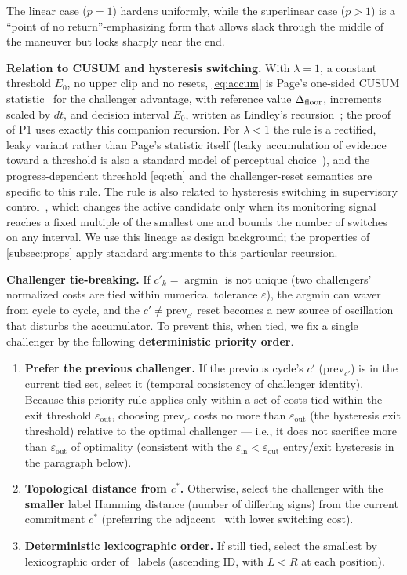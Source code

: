 The linear case ($p=1$) hardens uniformly, while the superlinear case ($p>1$) is a ``point of no return''-emphasizing form that allows slack through the middle of the maneuver but locks sharply near the end.

\noindent\textbf{Relation to CUSUM and hysteresis switching.} With $\lambda=1$, a constant threshold $E_0$, no upper clip and no resets, \eqref{eq:accum} is Page's one-sided CUSUM statistic~\citep{page1954cusum} for the challenger advantage, with reference value $\Delta_{\text{floor}}$, increments scaled by $dt$, and decision interval $E_0$, written as Lindley's recursion~\citep{lindley1952queue}; the proof of P1 uses exactly this companion recursion. For $\lambda<1$ the rule is a rectified, leaky variant rather than Page's statistic itself (leaky accumulation of evidence toward a threshold is also a standard model of perceptual choice~\citep{usher2001lca}), and the progress-dependent threshold \eqref{eq:eth} and the challenger-reset semantics are specific to this rule. The rule is also related to hysteresis switching in supervisory control~\citep{hespanha2003hysteresis}, which changes the active candidate only when its monitoring signal reaches a fixed multiple of the smallest one and bounds the number of switches on any interval. We use this lineage as design background; the properties of \cref{subsec:props} apply standard arguments to this particular recursion.

\noindent\textbf{Challenger tie-breaking.} If $c'_k = \operatorname*{argmin}$ is not unique (two challengers' normalized costs are tied within numerical tolerance $\varepsilon$), the argmin can waver from cycle to cycle, and the $c' \ne \text{prev}_{c'}$ reset becomes a new source of oscillation that disturbs the accumulator. To prevent this, when tied, we fix a single challenger by the following \textbf{deterministic priority order}.

\begin{enumerate}
\item \textbf{Prefer the previous challenger.} If the previous cycle's $c'$ ($\text{prev}_{c'}$) is in the current tied set, select it (temporal consistency of challenger identity). Because this priority rule applies only within a set of costs tied within the exit threshold $\varepsilon_{\text{out}}$, choosing $\text{prev}_{c'}$ costs no more than $\varepsilon_{\text{out}}$ (the hysteresis exit threshold) relative to the optimal challenger --- i.e., it does not sacrifice more than $\varepsilon_{\text{out}}$ of optimality (consistent with the $\varepsilon_{\text{in}} < \varepsilon_{\text{out}}$ entry/exit hysteresis in the paragraph below).
\item \textbf{Topological distance from $c^*$.} Otherwise, select the challenger with the \textbf{smaller} label Hamming distance (number of differing signs) from the current commitment $c^*$ (preferring the adjacent \Class\ with lower switching cost).
\item \textbf{Deterministic lexicographic order.} If still tied, select the smallest by lexicographic order of \Class\ labels (ascending ID, with $L < R$ at each position).
\end{enumerate}


